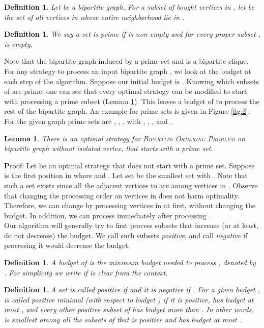 \documentclass[letterpaper,11pt,abstracton]{scrartcl}
\newcommand{\qed}{\hfill}
\newcommand{\pf}{{\textbf Proof: }}
\newtheorem{lemma}[theorem]{Lemma}
\newtheorem{dfn}[theorem]{Definition}
\begin{document}
\begin{dfn}\label{def:Nstar}
  Let  be a bipartite graph. For a subset  of bought vertices in ,
  let {} be the set of all vertices in  whose entire neighborhood lie in .
\end{dfn}

\begin{dfn}\label{def:prime}
  We say a set  is {\em prime} if  is non-empty and
  for every proper subset ,  is empty.
\end{dfn}

Note that the bipartite graph induced by a prime set  and  is a bipartite clique.
For any strategy to process an input bipartite graph , we look at the
budget at each step of the algorithm. Suppose our initial
budget is . Knowing which subsets of  are prime, one can see that every optimal strategy can be 
modified to start with processing a prime subset 
(Lemma \ref{first-prime}). This
leaves a budget of  to process the rest of the bipartite graph.
An example for prime sets is given in Figure \ref{fig:2}. For the given graph prime sets are ,
 , ,  with , , , and .

\begin{lemma}\label{first-prime}
There is an optimal strategy for \textsc{Bipartite Ordering Problem} on bipartite graph  without isolated vertex, 
that starts with a prime set.
\end{lemma}
\pf Let  be an optimal strategy that does not start with a prime set. Suppose  is the first position in  where  and
 . Let set  be the smallest set with . Note that such a set  exists since all the adjacent vertices to  are among vertices in . Observe that changing the processing order on vertices in  does not harm optimality. Therefore, we can change  by processing vertices in  at first, without changing the budget. In addition, we can process  immediately after processing .
\qed \\

Our algorithm will generally try to first process subsets  that
increase (or at least, do not decrease) the budget.  We call such
subsets \emph{positive}, and call  \emph{negative} if processing it
would decrease the budget.

\begin{dfn}\label{def:budget-for-prime}
  A budget of  is the minimum budget  needed to process , denoted by  .
  For simplicity we write  if  is clear from the context.
\end{dfn}

\begin{dfn}\label{def:positive} A set
   is called \emph{positive} if  and it is \emph{negative} if .
  For a given budget ,  is called \emph{positive minimal} (with respect to budget ) if it is positive,  has budget at most
  ,  and every other positive  subset of  has budget more than . In
  other words,  is  smallest among all the subsets of  that is positive and has
  budget at most .
\end{dfn}
\end{document}
